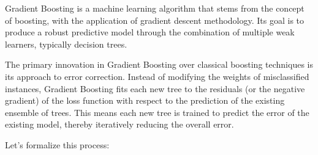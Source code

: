 Gradient Boosting is a machine learning algorithm that stems from the concept of boosting, with the application of gradient descent methodology. Its goal is to produce a robust predictive model through the combination of multiple weak learners, typically decision trees.

The primary innovation in Gradient Boosting over classical boosting techniques is its approach to error correction. Instead of modifying the weights of misclassified instances, Gradient Boosting fits each new tree to the residuals (or the negative gradient) of the loss function with respect to the prediction of the existing ensemble of trees. This means each new tree is trained to predict the error of the existing model, thereby iteratively reducing the overall error.

Let's formalize this process:

